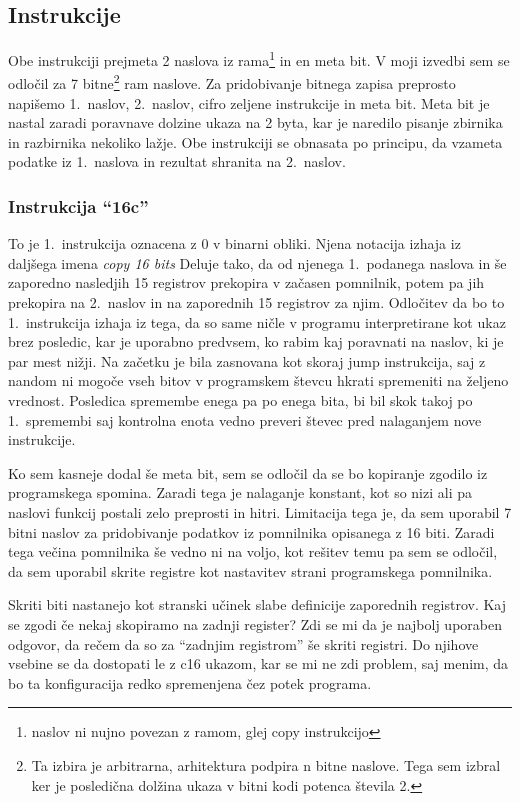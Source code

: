 \documentclass[12pt]{article}
\begin{document}
\subsection{Instrukcije}
Obe instrukciji prejmeta 2 naslova iz rama\footnote{naslov ni nujno povezan z ramom, glej copy instrukcijo} in en meta bit.
V moji izvedbi sem se odločil za 7 bitne\footnote{Ta izbira je arbitrarna, arhitektura podpira n bitne naslove. Tega sem izbral ker je posledična dolžina ukaza v bitni kodi potenca števila 2.} ram naslove.
Za pridobivanje bitnega zapisa preprosto napišemo 1.\ naslov, 2.\ naslov, cifro zeljene instrukcije in meta bit.
Meta bit je nastal zaradi poravnave dolzine ukaza na 2 byta, kar je naredilo pisanje zbirnika in razbirnika nekoliko lažje.
Obe instrukciji se obnasata po principu, da vzameta podatke iz 1.\ naslova in rezultat shranita na 2.\ naslov.

\subsubsection{Instrukcija ``16c''}
To je 1.\ instrukcija oznacena z 0 v binarni obliki.
Njena notacija izhaja iz daljšega imena \textit{copy 16 bits}
Deluje tako, da od njenega 1.\ podanega naslova in še zaporedno nasledjih 15 registrov prekopira v začasen pomnilnik, potem pa jih prekopira na 2.\ naslov in na zaporednih 15 registrov za njim.
Odločitev da bo to 1.\ instrukcija izhaja iz tega, da so same ničle v programu interpretirane kot ukaz brez posledic, kar je uporabno predvsem, ko rabim kaj poravnati na naslov, ki je par mest nižji.
Na začetku je bila zasnovana kot skoraj jump instrukcija, saj z nandom ni mogoče vseh bitov v programskem števcu hkrati spremeniti na željeno vrednost.
Posledica spremembe enega pa po enega bita, bi bil skok takoj po 1.\ spremembi saj kontrolna enota vedno preveri števec pred nalaganjem nove instrukcije.

Ko sem kasneje dodal še meta bit, sem se odločil da se bo kopiranje zgodilo iz programskega spomina.
Zaradi tega je nalaganje konstant, kot so nizi ali pa naslovi funkcij postali zelo preprosti in hitri.
Limitacija tega je, da sem uporabil 7 bitni naslov za pridobivanje podatkov iz pomnilnika opisanega z 16 biti.
Zaradi tega večina pomnilnika še vedno ni na voljo, kot rešitev temu pa sem se odločil, da sem uporabil skrite registre kot nastavitev strani programskega pomnilnika.

Skriti biti nastanejo kot stranski učinek slabe definicije zaporednih registrov.
Kaj se zgodi če nekaj skopiramo na zadnji register?
Zdi se mi da je najbolj uporaben odgovor, da rečem da so za ``zadnjim registrom'' še skriti registri.
Do njihove vsebine se da dostopati le z c16 ukazom, kar se mi ne zdi problem, saj menim, da bo ta konfiguracija redko spremenjena čez potek programa.
\end{document}
